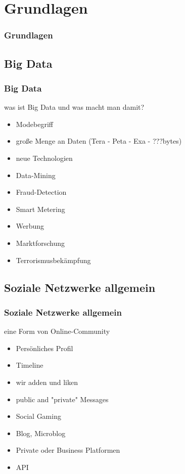 \documentclass[xcolor=dvipsnames]{beamer}
\begin{document}
\section{Grundlagen}
\begin{frame} %
  \frametitle{Grundlagen} %
\end{frame}

\subsection{Big Data}
\begin{frame} %
  \frametitle{Big Data} %
  \begin{block}{was ist Big Data und was macht man damit?}
	  \begin{itemize}
		\item Modebegriff
		\item große Menge an Daten (Tera - Peta - Exa - ???bytes)
	  	\item neue Technologien 
		\item Data-Mining
		\item Fraud-Detection
		\item Smart Metering
		\item Werbung
		\item Marktforschung
		\item Terrorismusbekämpfung
	  \end{itemize}
  \end{block}
\end{frame}


\subsection{Soziale Netzwerke allgemein}
\begin{frame} %
  \frametitle{Soziale Netzwerke allgemein} %
  \begin{block}{eine Form von Online-Community}
	  \begin{itemize}
		\item Persönliches Profil
		\item Timeline	
	  	\item wir adden und liken
		\item public and "private" Messages
		\item Social Gaming
		\item Blog, Microblog
		\item Private oder Business Platformen
		\item API		
	  \end{itemize}
  \end{block}
\end{frame}
\end{document}
